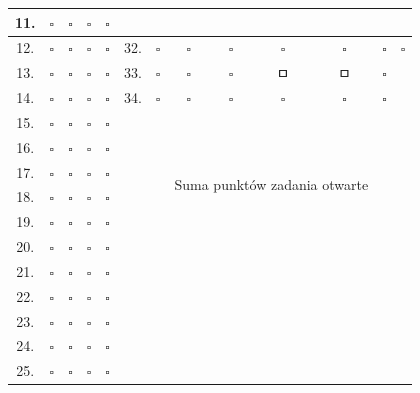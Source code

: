 \documentclass[10pt]{article}
\begin{document}
\begin{center}
\begin{tabular}{|c|c|c|c|c|c|c|c|c|c|c|c|c|}
\hline
11. & \(\square\) & \(\square\) & \(\square\) & \(\square\) &  &  &  &  &  &  &  &  \\
\hline
12. & \(\square\) & \(\square\) & \(\square\) & \(\square\) & 32. & \(\square\) & \(\square\) & \(\square\) & \(\square\) & \(\square\) & \(\square\) & \(\square\) \\
\hline
13. & \(\square\) & \(\square\) & \(\square\) & \(\square\) & 33. & \(\square\) & \(\square\) & \(\square\) & ㅁ & ㅁ & \(\square\) &  \\
\hline
14. & \(\square\) & \(\square\) & \(\square\) & \(\square\) & 34. & \(\square\) & \(\square\) & \(\square\) & \(\square\) & \(\square\) & \(\square\) &  \\
\hline
15. & \(\square\) & \(\square\) & \(\square\) & \(\square\) &  &  &  &  &  &  &  &  \\
\hline
16. & \(\square\) & \(\square\) & \(\square\) & \(\square\) &  &  &  &  &  &  &  &  \\
\hline
17. & \(\square\) & \(\square\) & \(\square\) & \(\square\) &  &  & \multicolumn{4}{|r|}{\multirow[t]{2}{*}{Suma punktów zadania otwarte}} &  &  \\
\hline
18. & \(\square\) & \(\square\) & \(\square\) & \(\square\) &  &  &  &  &  &  &  &  \\
\hline
19. & \(\square\) & \(\square\) & \(\square\) & \(\square\) &  &  &  &  &  &  &  &  \\
\hline
20. & \(\square\) & \(\square\) & \(\square\) & \(\square\) &  &  &  &  &  &  &  &  \\
\hline
21. & \(\square\) & \(\square\) & \(\square\) & \(\square\) &  &  &  &  &  &  &  &  \\
\hline
22. & \(\square\) & \(\square\) & \(\square\) & \(\square\) &  &  &  &  &  &  &  &  \\
\hline
23. & \(\square\) & \(\square\) & \(\square\) & \(\square\) &  &  &  &  &  &  &  &  \\
\hline
24. & \(\square\) & \(\square\) & \(\square\) & \(\square\) &  &  &  &  &  &  &  &  \\
\hline
25. & \(\square\) & \(\square\) & \(\square\) & \(\square\) &  &  &  &  &  &  &  &  \\
\hline

\end{tabular}
\end{center}
\end{document}
